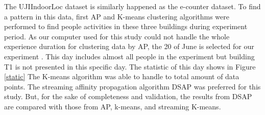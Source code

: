 










The UJIIndoorLoc dataset is similarly happened as the e-counter dataset. To find a pattern in this data, first AP and K-means clustering algorithms were performed to find people activities in these three buildings during experiment period. As our computer used for this study could not handle the whole experience duration for clustering data by AP, the 20 of June is selected for our experiment . This day includes almost all people in the experiment but building T1 is not presented in this specific day. The statistic of this day shows in Figure \ref{static} The K-means algorithm was able to handle to total amount of data points.
The streaming affinity propagation algorithm  DSAP was preferred for this study. But, for the sake of completeness and validation, the results from DSAP are compared with those from AP, k-means, and streaming K-means.


